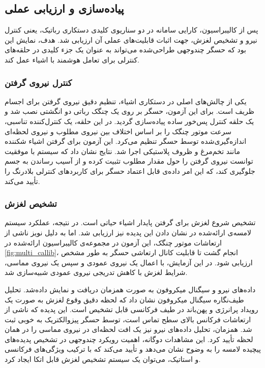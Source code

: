 \subsection{پیاده‌سازی و ارزیابی عملی}
پس از کالیبراسیون، کارایی سامانه در دو سناریوی کلیدی دستکاری رباتیک، یعنی کنترل نیرو و تشخیص لغزش، جهت اثبات قابلیت‌های عملی آن ارزیابی شد. هدف، نمایش این بود که حسگر چندوجهی طراحی‌شده می‌تواند به عنوان یک جزء کلیدی در حلقه‌های کنترلی برای تعامل هوشمند با اشیاء عمل کند.

\subsubsection{کنترل نیروی گرفتن}
یکی از چالش‌های اصلی در دستکاری اشیاء، تنظیم دقیق نیروی گرفتن برای اجسام ظریف است. برای این آزمون، حسگر بر روی یک چنگک رباتی دو انگشتی نصب شد و یک حلقه کنترل پس‌خور ساده پیاده‌سازی گردید. در این حلقه، یک کنترل‌کننده تناسبی، سرعت موتور چنگک را بر اساس اختلاف بین نیروی مطلوب و نیروی لحظه‌ای اندازه‌گیری‌شده توسط حسگر تنظیم می‌کرد.
این آزمون برای گرفتن اشیاء شکننده مانند تخم‌مرغ و ظروف پلاستیکی اجرا شد. نتایج نشان داد که سیستم با موفقیت توانست نیروی گرفتن را حول مقدار مطلوب تثبیت کرده و از آسیب رساندن به جسم جلوگیری کند، که این امر داده‌ی قابل اعتماد حسگر برای کاربردهای کنترلی بلادرنگ را تأیید می‌کند.

\subsubsection{تشخیص لغزش}
تشخیص شروع لغزش برای گرفتن پایدار اشیاء حیاتی است. در نتیجه، عملکرد سیستم لامسه‌ی ارائه‌شده در نشان دادن این پدیده‌ نیز ارزیابی شد. اما به دلیل نویز ناشی از ارتعاشات موتور چنگک، این آزمون در مجموعه‌ی کالیبراسیون ارائه‌شده در \ref{fig:multi_callib}، انجام گشت تا قابلیت کانال ارتعاشی حسگر به طور مشخص ارزیابی شود. در این آزمایش، با اعمال یک نیروی عمودی و سپس یک نیروی مماسی، شرایط لغزش با کاهش تدریجی نیروی عمودی شبیه‌سازی شد.

داده‌های نیرو و سیگنال میکروفون به صورت همزمان دریافت و نمایش داده‌شد. تحلیل طیف‌نگاره سیگنال میکروفون نشان داد که لحظه دقیق وقوع لغزش به صورت یک رویداد پرانرژی و پهن‌باند در طیف فرکانسی قابل تشخیص است. این پدیده که ناشی از ارتعاشات فرکانس بالای سطح تماس است، توسط حسگر پیزوالکتریک به خوبی ثبت شد. همزمان، تحلیل داده‌های نیرو نیز یک افت لحظه‌ای در نیروی مماسی را در همان لحظه تأیید کرد. این مشاهدات دوگانه، اهمیت رویکرد چندوجهی در تشخیص پدیده‌های پیچیده لامسه را به وضوح نشان می‌دهد و تأیید می‌کند که با ترکیب ویژگی‌های فرکانسی و استاتیک، می‌توان یک سیستم تشخیص لغزش قابل اتکا ایجاد کرد.

